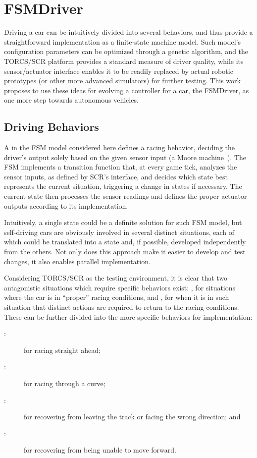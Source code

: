 \section{FSMDriver}\label{sec:3}%
Driving a car can be intuitively divided into several behaviors, and thus provide a straightforward implementation as a finite-state machine model. Such model's configuration parameters can be optimized through a genetic algorithm, and the TORCS/SCR platform provides a standard measure of driver quality, while its sensor/actuator interface enables it to be readily replaced by actual robotic prototypes (or other more advanced simulators) for further testing. This work proposes to use these ideas for evolving a controller for a car, the FSMDriver, as one more step towards autonomous vehicles.






\subsection{Driving Behaviors}%
A  in the FSM model considered here defines a racing behavior, deciding the driver's output solely based on the given sensor input (a Moore machine~\cite{Ajzerman}). The FSM implements a transition function that, at every game tick, analyzes the sensor inputs, as defined by SCR's interface, and decides which state best represents the current situation, triggering a change in states if necessary. The current state then processes the sensor readings and defines the proper actuator outputs according to its implementation.

Intuitively, a single  state could be a definite solution for such FSM model, but self-driving cars are obviously involved in several distinct situations, each of which could be translated into a state and, if possible, developed independently from the others. Not only does this approach make it easier to develop and test changes, it also enables parallel implementation.

Considering TORCS/SCR as the testing environment, it is clear that two antagonistic situations which require specific behaviors exist: \racing, for situations where the car is in ``proper'' racing conditions, and \recovery, for when it is in such situation that distinct actions are required to return to the racing conditions. These can be further divided into the more specific behaviors for implementation:
\begin{description}
	\item[\SL:] for racing straight ahead;
	\item[\C:] for racing through a curve;
	\item[\OT:] for recovering from leaving the track or facing the wrong direction; and
	\item[\St:] for recovering from being unable to move forward.
\end{description}

